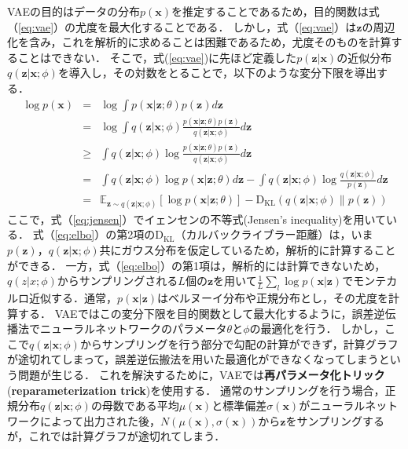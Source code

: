 VAEの目的はデータの分布$p(\bm{x})$を推定することであるため，目的関数は式（\ref{eq:vae}）の尤度を最大化することである．
しかし，式（\ref{eq:vae}）は$\bm{z}$の周辺化を含み，これを解析的に求めることは困難であるため，尤度そのものを計算することはできない．
そこで，式(\ref{eq:vae})に先ほど定義した$p(\bm{z}|\bm{x})$の近似分布$q(\bm{z}|\bm{x};\phi)$を導入し，その対数をとることで，以下のような変分下限を導出する．
\begin{eqnarray}
\log p(\bm{x}) &=& \log \int p(\bm{x}|\bm{z}; \theta) p(\bm{z}) d\bm{z} \nonumber \\
&=& \log \int q(\bm{z}|\bm{x}; \phi) \frac{p(\bm{x}|\bm{z}; \theta) p(\bm{z})}{q(\bm{z}|\bm{x}; \phi)} d\bm{z} \nonumber \\
&\geq& \int q(\bm{z}|\bm{x}; \phi) \log \frac{p(\bm{x}|\bm{z}; \theta) p(\bm{z})}{q(\bm{z}|\bm{x}; \phi)} d\bm{z} \label{eq:jensen}\\
&=& \int q(\bm{z}|\bm{x}; \phi) \log p(\bm{x}|\bm{z}; \theta) d\bm{z} - \int q(\bm{z}|\bm{x}; \phi) \log \frac{q(\bm{z}|\bm{x}; \phi)}{p(\bm{z})} d\bm{z} \nonumber \\
&=& \mathbb{E}_{\bm{z} \sim q(\bm{z}|\bm{x}; \phi)} [\log p(\bm{x}|\bm{z}; \theta)] - \mathrm{D_{KL}}(q(\bm{z}|\bm{x}; \phi) \| p(\bm{z})) \label{eq:elbo}
\end{eqnarray}
ここで，式（\ref{eq:jensen}）でイェンセンの不等式(Jensen's inequality)を用いている．
式（\ref{eq:elbo}）の第2項の$\mathrm{D_{KL}}$（カルバックライブラー距離）は，いま$p(\bm{z})$，$q(\bm{z}|\bm{x}; \phi)$共にガウス分布を仮定しているため，解析的に計算することができる．
一方，式（\ref{eq:elbo}）の第1項は，解析的には計算できないため，$q(z|x; \phi)$からサンプリングされる$L$個の$\bm{z}$を用いて$\frac{1}{L} \sum_{l} \log p(\bm{x}|\bm{z})$でモンテカルロ近似する．通常，$p(\bm{x}|\bm{z})$はベルヌーイ分布や正規分布とし，その尤度を計算する．
VAEではこの変分下限を目的関数として最大化するように，誤差逆伝播法でニューラルネットワークのパラメータ$\theta$と$\phi$の最適化を行う．
しかし，ここで$q(\bm{z}|\bm{x}; \phi)$からサンプリングを行う部分で勾配の計算ができず，計算グラフが途切れてしまって，誤差逆伝搬法を用いた最適化ができなくなってしまうという問題が生じる．
これを解決するために，VAEでは{\bf 再パラメータ化トリック}({\bf reparameterization trick})を使用する．
通常のサンプリングを行う場合，正規分布$q(\bm{z}|\bm{x}; \phi)$の母数である平均$\mu (\bm{x})$と標準偏差$\sigma (\bm{x})$がニューラルネットワークによって出力された後，$N(\mu (\bm{x}), \sigma (\bm{x}))$から$\bm{z}$をサンプリングするが，これでは計算グラフが途切れてしまう．
